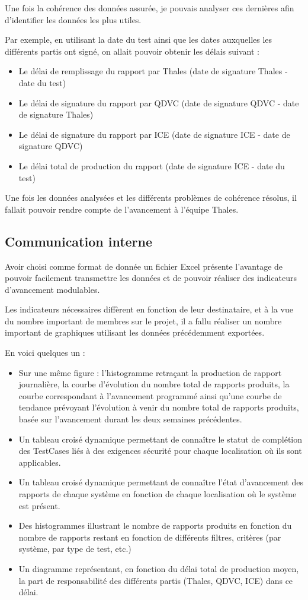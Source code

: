 Une fois la cohérence des données assurée, je pouvais analyser ces dernières afin d'identifier les données les plus utiles.

Par exemple, en utilisant la date du test ainsi que les dates auxquelles les différents partis ont signé, on allait pouvoir obtenir les délais suivant :
\begin{itemize}
\item Le délai de remplissage du rapport par Thales (date de signature Thales - date du test)
\item Le délai de signature du rapport par QDVC (date de signature QDVC - date de signature Thales)
\item Le délai de signature du rapport par ICE (date de signature ICE - date de signature QDVC)
\item Le délai total de production du rapport (date de signature ICE - date du test)
\end{itemize}

Une fois les données analysées et les différents problèmes de cohérence résolus, il fallait pouvoir rendre compte de l'avancement à l'équipe Thales.

\subsection{Communication interne}
Avoir choisi comme format de donnée un fichier Excel présente l'avantage de pouvoir facilement transmettre les données et de pouvoir réaliser des indicateurs d'avancement modulables.

Les indicateurs nécessaires diffèrent en fonction de leur destinataire, et à la vue du nombre important de membres sur le projet, il a fallu réaliser un nombre important de graphiques utilisant les données précédemment exportées.

En voici quelques un :

\begin{itemize}
\item Sur une même figure : l'histogramme retraçant la production de rapport journalière, la courbe d'évolution du nombre total de rapports produits, la courbe correspondant à l'avancement programmé ainsi qu'une courbe de tendance prévoyant l'évolution à venir du nombre total de rapports produits, basée sur l'avancement durant les deux semaines précédentes.
\item Un tableau croisé dynamique permettant de connaître le statut de complétion des \gls{TestCases} liés à des exigences sécurité pour chaque localisation où ils sont applicables.
\item Un tableau croisé dynamique permettant de connaître l'état d'avancement des rapports de chaque système en fonction de chaque localisation où le système est présent.
\item Des histogrammes illustrant le nombre de rapports produits en fonction du nombre de rapports restant en fonction de différents filtres, critères (par système, par type de test, etc.)
\item Un diagramme représentant, en fonction du délai total de production moyen, la part de responsabilité des différents partis (Thales, QDVC, ICE) dans ce délai.
\end{itemize}


